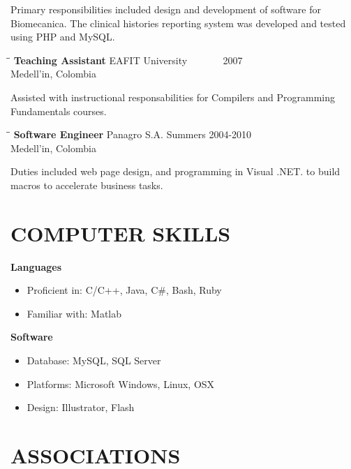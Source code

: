 \documentclass{res}
\begin{document}
\begin{resume}
	Primary responsibilities included design and development of software for Biomecanica.
	The clinical histories reporting system was developed and tested  using PHP and MySQL.

   \begin{tabbing}
   \hspace{2.3in}\= \hspace{2.6in}\= \kill %
    {\bf Teaching Assistant} \>EAFIT University\> ~~~~~~ 2007\\
                          \>Medell\a'in, Colombia
   \end{tabbing}\vspace{-15pt}
    Assisted with instructional responsabilities for Compilers and Programming Fundamentals courses.
   \begin{tabbing}%
   \hspace{2.3in}\= \hspace{2.6in}\= \kill %
   {\bf Software Engineer}\> Panagro S.A.\> Summers  2004-2010\\
                          \>Medell\a'in, Colombia
   \end{tabbing}\vspace{-15pt}
    Duties included web page design, and programming in Visual .NET. to build macros to accelerate business tasks.

\section{COMPUTER SKILLS}
	\vspace{0.05 in}	

    \textbf{Languages}\\
	\vspace{-0.1 in}	
    \begin{itemize}
    	\item Proficient in: C/C++, Java, C\#, Bash, Ruby
    	\item Familiar with: Matlab
    \end{itemize}

	\textbf{Software}
	\begin{itemize}
		\item Database: MySQL, SQL Server
		\item Platforms: Microsoft Windows, Linux, OSX
		\item Design: Illustrator, Flash
	\end{itemize} 

\section{ASSOCIATIONS}


\end{resume}
\end{document}
